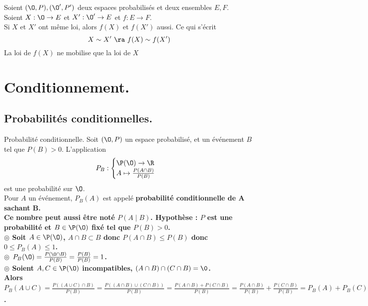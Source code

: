 \documentclass[11pt]{article}
\begin{document}
\begin{prop}{}{}
    Soient $(\O,P), (\O',P')$ deux espaces probabilisés et deux ensembles $E,F$.\\
    Soient $X:\O\to E$ et $X':\O'\to E$ et $f:E\to F$.\\
    Si $X$ et $X'$ ont même loi, alors $f(X)$ et $f(X')$ aussi. Ce qui s'écrit
    \begin{equation*}
        X \sim X' ~ \ra ~ f(X) \sim f(X')
    \end{equation*}
    \tcblower
    La loi de $f(X)$ ne mobilise que la loi de $X$
\end{prop}

\section{Conditionnement.}
\subsection{Probabilités conditionnelles.}

\begin{defi}{Probabilité conditionnelle.}{}
    Soit $(\O,P)$ un espace probabilisé, et un événement $B$ tel que $P(B)>0$. L'application
    \begin{equation*}
        P_B:\begin{cases}\P(\O)\to\R\\A\mapsto\frac{P(A\cap B)}{P(B)}\end{cases}
    \end{equation*}
    est une probabilité sur $\O$.\\
    Pour $A$ un événement, $P_B(A)$ est appelé \bf{probabilité conditionnelle de A sachant B}.\\
    Ce nombre peut aussi être noté $P(A\mid B)$.
    \tcblower
    Hypothèse : $P$ est une probabilité et $B\in\P(\O)$ fixé tel que $P(B)>0$.\\
    $\circledcirc$ Soit $A\in\P(\O)$, $A\cap B\subset B$ donc $P(A\cap B)\leq P(B)$ donc $0\leq P_B(A)\leq1$.\\
    $\circledcirc$ $P_B(\O)=\frac{P(\O\cap B)}{P(B)}=\frac{P(B)}{P(B)}=1$.\\
    $\circledcirc$ Soient $A,C\in\P(\O)$ incompatibles, $(A\cap B)\cap(C\cap B)=\0$.\\
    Alors $P_B(A\cup C)=\frac{P((A\cup C)\cap B)}{P(B)}=\frac{P((A\cap B)\cup(C\cap B))}{P(B)}=\frac{P(A\cap B)+P(C\cap B)}{P(B)}=\frac{P(A\cap B)}{P(B)}+\frac{P(C\cap B)}{P(B)}=P_B(A)+P_B(C)$.
\end{defi}
\end{document}
